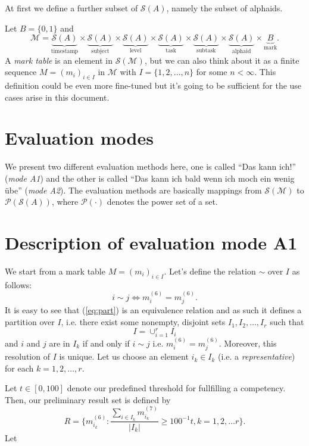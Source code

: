 \documentclass{scrartcl}
\begin{document}
At first we define a further subset of $\mathcal{S}(A)$, namely the subset of alphaids.

Let $B=\{0,1\}$ and $$\mathcal{M}=\underbrace{\mathcal{S}(A)}_{\mbox{timestamp}}\times\underbrace{\mathcal{S}(A)}_{\mbox{subject}}\times\underbrace{\mathcal{S}(A)}_{\mbox{level}}\times\underbrace{\mathcal{S}(A)}_{\mbox{task}}\times\underbrace{\mathcal{S}(A)}_{\mbox{subtask}}\times\underbrace{\mathcal{S}(A)}_{\mbox{alphaid}}\times \underbrace{B}_{\mbox{mark}}.$$ A \emph{mark table} is an element in $\mathcal{S}(\mathcal{M})$, but we can also think about it as a finite sequence $M=(m_i)_{i\in I}$ in $\mathcal{M}$ with $I=\{1,2,\ldots,n\}$ for some $n<\infty$. This definition could be even more fine-tuned but it's going to be sufficient for the use cases arise in this document.

\section{Evaluation modes}
We present two different evaluation methods here, one is called ``Das kann ich!'' (\emph{mode A1}) and the other is called ``Das kann ich bald wenn ich moch ein wenig übe'' (\emph{mode A2}). The evaluation methods are basically mappings from $\mathcal{S}({\mathcal{M}})$ to $\mathcal{P}({\mathcal{S}(A)})$, where $\mathcal{P}(\cdot)$ denotes the power set of a set.

\section{Description of evaluation mode A1}
We start from a mark table $M=(m_i)_{i\in I}$. Let's define the relation $\sim$ over $I$ as follows:
\begin{equation}
i\sim j \Leftrightarrow m_i^{(6)}=m_j^{(6)}.
\label{eq:part}
\end{equation}
It is easy to see that (\ref{eq:part}) is an equivalence relation and as such it defines a partition over $I$, i.e. there exist some nonempty, disjoint sets $I_1,I_2,\ldots,I_r$ such that $$I=\cup_{i=1}^r I_i$$ and $i$ and $j$ are in $I_k$ if and only if $i\sim j$ i.e. $m_i^{(6)}=m_j^{(6)}$. Moreover, this resolution of $I$ is unique. Let us choose an element $i_k\in I_k$ (i.e. a \emph{representative}) for each $k=1,2,\ldots,r$.

Let $t\in [0,100]$ denote our predefined threshold for fullfilling a competency. Then, our preliminary result set is defined by 
$$R=\{m_{i_k}^{(6)}: \frac{\sum_{i \in I_k}m_{i_k}^{(7)}}{|I_k|}\geq 100^{-1}t, k=1,2,\ldots r\}.$$
Let 
\end{document}
